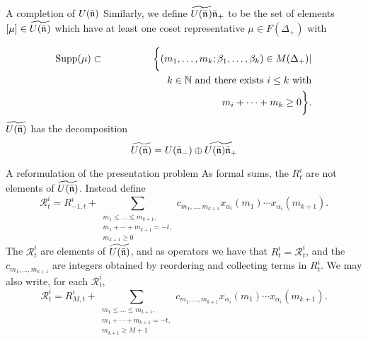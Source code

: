 \documentclass{beamer}
\begin{document}
\begin{frame}{A completion of $U(\bar{\frak{n}})$}
 Similarly, we define
$ \widetilde{U(\bar{\frak{n}}_{})} \bar{\frak{n}}_{+}
$
to be the set of elements $[\mu] \in \widetilde{U(\bar{\frak{n}}_{})}$ which have at least one coset representative
$\mu \in F(\Delta_+)$ with

\begin{eqnarray*}
\mathrm{Supp}(\mu) \subset && \biggl\{ (m_1,\dots,m_k; \beta_1, \dots, \beta_k) \in M(\Delta_+) |\\ &&\hspace{.5in} \ k
\in \mathbb{N}\ \mathrm{ and\ there\ exists\ } i \le
k\ \mathrm{with}\\&& \hspace{1.5in} \ m_i + \dots + m_k \ge 0 \biggr\}.
\end{eqnarray*}
\pause
$\widetilde{U(\bar{\frak{n}})}$ has the decomposition
\begin{equation}\label{compdecomp}
\widetilde{U(\bar{\frak{n}})} = U(\bar{\frak{n}}_{-}) \oplus
\widetilde{U(\bar{\frak{n}})\bar{\frak{n}}_{+}}
\end{equation}
\end{frame}

\begin{frame}{A reformulation of the presentation problem}
 As formal sums, the $R_t^i$ are not elements of $\widetilde{U(\bar{\frak{n}})}$.
 \pause Instead define
\begin{equation*}\label{-1rep}
\mathcal{R}_t^i = R_{-1,t}^i + \sum_{\begin{array} {c} m_1 \le \dots
    \le m_{k+1}, \\ m_1+ \cdots + m_{k+1}=-t, \\ m_{k+1} \ge
    0 \end{array}}c_{m_1, \dots, m_{k+1}} x_{\alpha_i}(m_1) \cdots
x_{\alpha_i}(m_{k+1}).
\end{equation*}
\pause
The $\mathcal{R}_t^i$ are elements of $\widetilde{U(\bar{\frak{n}})}$, and as operators we have that
$R_t^i = \mathcal{R}_t^i$, and the $c_{m_1, \dots, m_{k+1}}$ are integers obtained by
reordering and collecting terms in $R_t^i$.
\pause
 We may also
write, for each $\mathcal{R}_t^i$,
\begin{equation}\label{Mrep}
\mathcal{R}_t^i = R_{M,t}^i + \sum_{\begin{array} {c} m_1 \le \dots
    \le m_{k+1}, \\ m_1+ \cdots + m_{k+1}=-t, \\ m_{k+1} \ge
    M+1 \end{array}}c_{m_1, \dots, m_{k+1}} x_{\alpha_i}(m_1) \cdots
x_{\alpha_i}(m_{k+1}).
\end{equation}
\end{frame}
\end{document}
